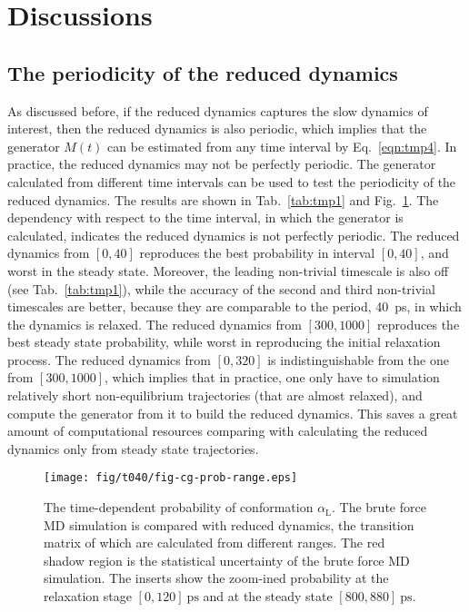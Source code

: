 \documentclass[aps, pre, preprint,unsortedaddress,a4paper,onecolumn]{revtex4-1}
\newcommand{\redc}[1]{{\color{red} #1}}
\newcommand{\confc}[0]{{\alpha_{\textrm{L}}}}
\begin{document}
\section{Discussions}
\subsection{The periodicity of the reduced dynamics}


As discussed before, if the reduced dynamics captures the slow
dynamics of interest, then the reduced dynamics is also periodic,
which implies that the generator $M(t)$ can be estimated from any time
interval by Eq.~\eqref{eqn:tmp4}. In practice, the reduced dynamics
may not be perfectly periodic. The generator calculated from
different time intervals can be used to test the periodicity of the
reduced dynamics. The results are shown in Tab.~\ref{tab:tmp1} and
Fig.~\ref{fig:tmp2}.  The dependency with respect to the time
interval, in which the generator is calculated, indicates the reduced
dynamics is not perfectly periodic. The reduced dynamics from $[0,40]$
reproduces the best probability in interval $[0,40]$, and worst in the
steady state. Moreover, the leading non-trivial timescale is also off
(see Tab.~\ref{tab:tmp1}), while the accuracy of the second and third
non-trivial timescales are better, because they are comparable to the
period, 40~ps, in which the dynamics is relaxed. The reduced dynamics
from $[300,1000]$ reproduces the best steady state probability, while
worst in reproducing the initial relaxation process. The reduced
dynamics from $[0,320]$ is indistinguishable from the one from
$[300,1000]$, which implies that in practice, one only have to
simulation relatively short non-equilibrium trajectories (that are
almost relaxed), and compute the generator from it to build the reduced dynamics. \redc{This saves a great
amount of computational resources comparing with calculating the
reduced dynamics only from steady state trajectories.}


\begin{figure}
  \centering
  \texttt{[image: fig/t040/fig-cg-prob-range.eps]}  
  \caption{The time-dependent probability of conformation
    $\confc$. The brute force MD simulation is compared with reduced
    dynamics, the transition matrix of which are calculated from
    different ranges. The red shadow region is the statistical uncertainty of the brute force MD simulation.
    The inserts show the zoom-ined probability at the relaxation stage $[0,120 ]~\textrm{ps}$ and at the steady state $[800,880 ]~\textrm{ps}$.}
  \label{fig:tmp2}
\end{figure}
\end{document}
